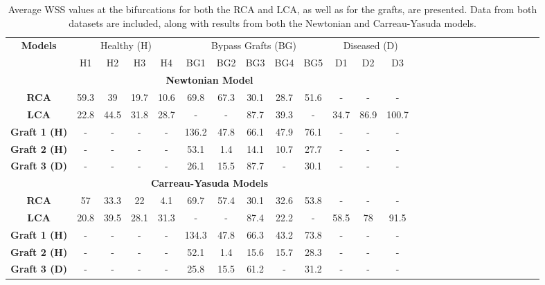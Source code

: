 ﻿\documentclass[12pt,a4paper]{article}
\theoremstyle{definition}
\numberwithin{equation}{section}
\begin{document}
\begin{table}[h!]
\centering
    \setlength{\tabcolsep}{4.5pt}
    \renewcommand{\arraystretch}{0.9}
   \caption{Average WSS values at the bifurcations for both the RCA and LCA, as well as for the grafts, are presented. Data from both datasets are included, along with results from both the Newtonian and Carreau-Yasuda models.}
    \begin{tabular}{|c|c|c|c|c|c|c|c|c|c|c|c|c|c|c|c|c|c|c|c|c|c|c|c|c|c|} 
    \hline 
    \multirow{2}{*}{\textbf{Models}} & \multicolumn{4}{c|}{Healthy (H)} & \multicolumn{5}{c|}{Bypass Grafts (BG)} &\multicolumn{3}{c|}{Diseased (D)} \\ \cline{2-13} & H1 & H2 & H3 & H4 & BG1 & BG2 & BG3 & BG4 & BG5 & D1 & D2 & D3 \\ \hline
 \multicolumn{13}{|c|}{\textbf{Newtonian Model}}\\ \hline  \textbf{RCA}& 59.3 & 39 & 19.7 & 10.6& 69.8 & 67.3 & 30.1 & 28.7 & 51.6 &- & - &-  \\ \hline  \textbf{LCA}& 22.8 & 44.5 & 31.8 & 28.7& - &- & 87.7 & 39.3 & - & 34.7&86.9& 100.7  \\ \hline 
   \textbf{Graft 1 (H)}& - & - & - & -& 136.2 & 47.8 & 66.1 & 47.9 & 76.1 & - &-& -  \\ \hline 
   \textbf{Graft 2 (H)}& - & - & - & -& 53.1 & 1.4 & 14.1 & 10.7 & 27.7 & - &-& - \\ \hline 
   \textbf{Graft 3 (D)}& - & - & - & -& 26.1 & 15.5 & 87.7 & - & 30.1 & - &-& - \\ \hline
    \multicolumn{13}{|c|}{\textbf{Carreau-Yasuda Models}}\\ \hline  \textbf{RCA}& 57 & 33.3 & 22 & 4.1& 69.7 & 57.4 & 30.1 & 32.6 & 53.8 &- & - &-  \\ \hline  \textbf{LCA}& 20.8 & 39.5 & 28.1 & 31.3& - &- & 87.4 & 22.2 & - & 58.5& 78& 91.5  \\ \hline 
   \textbf{Graft 1 (H)}& - & - & - & -& 134.3 & 47.8 & 66.3 & 43.2 & 73.8 & - &-& -  \\ \hline 
   \textbf{Graft 2 (H)}& - & - & - & -& 52.1 & 1.4 & 15.6 & 15.7 & 28.3 & - &-& - \\ \hline 
   \textbf{Graft 3 (D)}& - & - & - & -& 25.8 & 15.5 & 61.2 & - & 31.2 & - &-& - \\ \hline
    \end{tabular}
    \label{tab:c}
\end{table}
\end{document}
